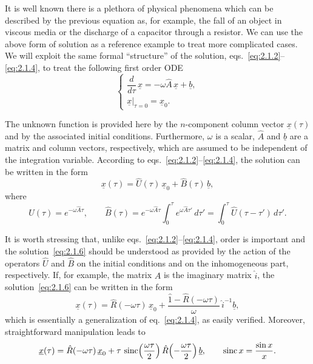 It is well known there is a plethora of physical phenomena which can be described by the previous equation as, for example, the fall of an object in viscous media or the discharge of a capacitor through a resistor. We can use the above form of solution as a reference example to treat more complicated cases. We will exploit the same formal ``structure'' of the solution, eqs.~\eqref{eq:2.1.2}--\eqref{eq:2.1.4}, to treat the following first order ODE
\begin{equation}
\begin{cases}
\dfrac{d}{d\tau}\,\underline{x}=-\omega\hat{A}\,\underline{x}+\underline{b},\\[2mm]
\underline{x}\big|_{\tau=0}=\underline{x}_{0}.
\end{cases}
\label{eq:2.1.5}
\end{equation}

The unknown function is provided here by the $n$-component column vector $\underline{x}(\tau)$ and by the associated initial conditions. Furthermore, $\omega$ is a scalar, $\hat{A}$ and $\underline{b}$ are a matrix and column vectors, respectively, which are assumed to be independent of the integration variable. According to eqs.~\eqref{eq:2.1.2}--\eqref{eq:2.1.4}, the solution can be written in the form
\begin{equation}
\underline{x}(\tau)=\hat{U}(\tau)\,\underline{x}_{0}+\hat{B}(\tau)\,\underline{b},
\label{eq:2.1.6}
\end{equation}
where
\begin{equation}
\hat{U}(\tau)=e^{-\omega\hat{A}\tau},\qquad
\hat{B}(\tau)=e^{-\omega\hat{A}\tau}\int_{0}^{\tau}e^{\omega\hat{A}\tau'}\,d\tau'
=\int_{0}^{\tau}\hat{U}(\tau-\tau')\,d\tau'.
\label{eq:2.1.7}
\end{equation}

It is worth stressing that, unlike eqs.~\eqref{eq:2.1.2}--\eqref{eq:2.1.4}, order is important and the solution~\eqref{eq:2.1.6} should be understood as provided by the action of the operators $\hat{U}$ and $\hat{B}$ on the initial conditions and on the inhomogeneous part, respectively. If, for example, the matrix $\hat{A}$ is the imaginary matrix $\hat{i}$, the solution~\eqref{eq:2.1.6} can be written in the form
\begin{equation}
\underline{x}(\tau)=\hat{R}(-\omega\tau)\,\underline{x}_{0}
+\frac{\hat{1}-\hat{R}(-\omega\tau)}{\omega}\,\hat{i}^{-1}\underline{b},
\label{eq:2.1.8}
\end{equation}
which is essentially a generalization of eq.~\eqref{eq:2.1.4}, as easily verified. Moreover, straightforward manipulation leads to
\begin{equation}
\underline{x}(\tau)=\hat{R}(-\omega\tau)\,\underline{x}_{0}
+\tau\,\operatorname{sinc}\!\left(\frac{\omega\tau}{2}\right)
\hat{R}\!\left(-\frac{\omega\tau}{2}\right)\underline{b},
\qquad \operatorname{sinc} x=\frac{\sin x}{x}.
\label{eq:2.1.9}
\end{equation}

